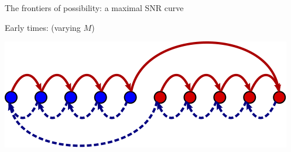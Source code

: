\documentclass[final,hyperref={pdfpagelabels=false,bookmarks=false}]{beamer}
\begin{document}
\begin{frame}{}
\begin{columns}[t]
\begin{column}{0.32\linewidth}
\begin{block}{The frontiers of possibility: a maximal SNR curve}
\vp
\parbox[c]{0.45\linewidth}{
 \begin{center}
 \end{center}
}
\hspace{0.5cm}
\parbox[c]{0.45\linewidth}{
   Early times: (varying $M$)
   \begin{center}
     \includegraphics[width=0.7\linewidth]{diffjump.svg}
   \end{center}

}
\end{block}
\end{column}
\end{columns}
\end{frame}
\end{document}

